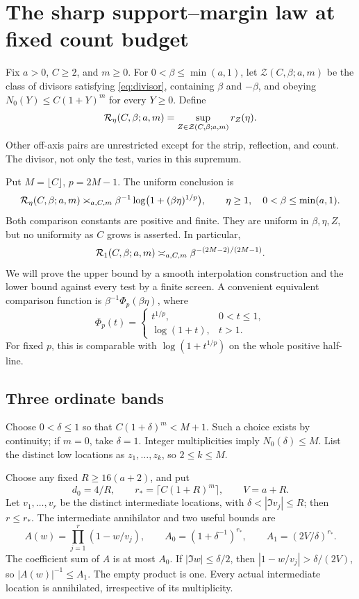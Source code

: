\section{The sharp support--margin law at fixed count budget}
\label{sec:frontier}

Fix \(a>0\), \(C\ge2\), and \(m\ge0\). For
\(0<\beta\le\min(a,1)\), let \(\mathcal Z(C,\beta;a,m)\)
be the class of divisors satisfying \eqref{eq:divisor}, containing
\(\beta\) and \(-\beta\), and obeying
\(N_0(Y)\le C(1+Y)^m\) for every \(Y\ge0\). Define
\[
 \mathcal R_\eta(C,\beta;a,m)=\sup_{Z\in\mathcal Z(C,\beta;a,m)}r_Z(\eta).
\]
Other off-axis pairs are unrestricted except for the strip, reflection,
and count. The divisor, not only the test, varies in this supremum.

Put \(M=\lfloor C\rfloor\), \(p=2M-1\). The uniform conclusion is
\begin{equation}\label{frontier:statement}
 \mathcal R_\eta(C,\beta;a,m)
 \asymp_{a,C,m}
 \beta^{-1}\log\bigl(1+(\beta\eta)^{1/p}\bigr),
 \qquad \eta\ge1,\quad0<\beta\le\min(a,1).
\end{equation}
Both comparison constants are positive and finite. They are uniform
in \(\beta,\eta,Z\), but no uniformity as \(C\) grows is
asserted. In particular,
\[
 \mathcal R_1(C,\beta;a,m)\asymp_{a,C,m}\beta^{-(2M-2)/(2M-1)}.
\]
We will prove the upper bound by a smooth interpolation construction
and the lower bound against every test by a finite screen. A convenient
equivalent comparison function is \(\beta^{-1}\Phi_p(\beta\eta)\), where
\begin{equation}\label{frontier:comparison}
 \Phi_p(t)=
 \begin{cases}t^{1/p},&0<t\le1,\\ \log(1+t),&t>1.
 \end{cases}
\end{equation}
For fixed \(p\), this is comparable with
\(\log(1+t^{1/p})\) on the whole positive half-line.

\subsection{Three ordinate bands}
Choose \(0<\delta\le1\) so that
\(C(1+\delta)^m<M+1\). Such a choice exists by continuity;
if \(m=0\), take \(\delta=1\). Integer multiplicities imply
\(N_0(\delta)\le M\). List the distinct low locations as
\(z_1,\ldots,z_k\), so \(2\le k\le M\).

Choose any fixed \(R\ge16(a+2)\), and put
\[
 d_0=4/R,\qquad r_* =\lceil C(1+R)^m\rceil,\qquad V=a+R.
\]
Let \(v_1,\ldots,v_r\) be the distinct intermediate locations,
with \(\delta<|\Im v_j|\le R\); then \(r\le r_*\).
The intermediate annihilator and two useful bounds are
\begin{equation}\label{frontier:annihilator}
 A(w)=\prod_{j=1}^r(1-w/v_j),\qquad
 A_0=(1+\delta^{-1})^{r_*},\qquad
 A_1=(2V/\delta)^{r_*}.
\end{equation}
The coefficient sum of \(A\) is at most \(A_0\). If
\(|\Im w|\le\delta/2\), then
\(|1-w/v_j|>\delta/(2V)\), so \(|A(w)|^{-1}\le A_1\).
The empty product is one. Every actual intermediate location is
annihilated, irrespective of its multiplicity.

